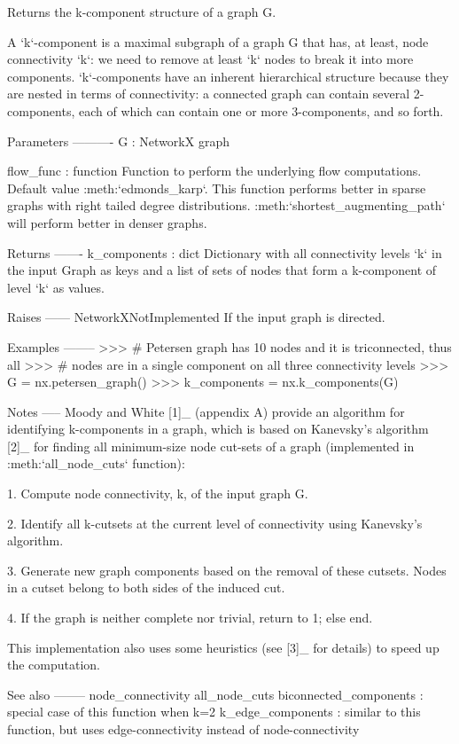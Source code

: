 \begin{DoxyVerb}Returns the k-component structure of a graph G.

A `k`-component is a maximal subgraph of a graph G that has, at least,
node connectivity `k`: we need to remove at least `k` nodes to break it
into more components. `k`-components have an inherent hierarchical
structure because they are nested in terms of connectivity: a connected
graph can contain several 2-components, each of which can contain
one or more 3-components, and so forth.

Parameters
----------
G : NetworkX graph

flow_func : function
    Function to perform the underlying flow computations. Default value
    :meth:`edmonds_karp`. This function performs better in sparse graphs with
    right tailed degree distributions. :meth:`shortest_augmenting_path` will
    perform better in denser graphs.

Returns
-------
k_components : dict
    Dictionary with all connectivity levels `k` in the input Graph as keys
    and a list of sets of nodes that form a k-component of level `k` as
    values.

Raises
------
NetworkXNotImplemented
    If the input graph is directed.

Examples
--------
>>> # Petersen graph has 10 nodes and it is triconnected, thus all
>>> # nodes are in a single component on all three connectivity levels
>>> G = nx.petersen_graph()
>>> k_components = nx.k_components(G)

Notes
-----
Moody and White [1]_ (appendix A) provide an algorithm for identifying
k-components in a graph, which is based on Kanevsky's algorithm [2]_
for finding all minimum-size node cut-sets of a graph (implemented in
:meth:`all_node_cuts` function):

    1. Compute node connectivity, k, of the input graph G.

    2. Identify all k-cutsets at the current level of connectivity using
       Kanevsky's algorithm.

    3. Generate new graph components based on the removal of
       these cutsets. Nodes in a cutset belong to both sides
       of the induced cut.

    4. If the graph is neither complete nor trivial, return to 1;
       else end.

This implementation also uses some heuristics (see [3]_ for details)
to speed up the computation.

See also
--------
node_connectivity
all_node_cuts
biconnected_components : special case of this function when k=2
k_edge_components : similar to this function, but uses edge-connectivity
    instead of node-connectivity


\end{DoxyVerb}
